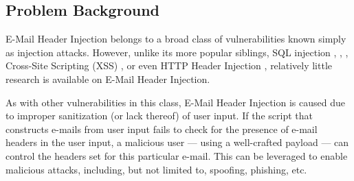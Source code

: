 \subsection{Problem Background}

E-Mail Header Injection belongs to a broad class of vulnerabilities known simply as injection attacks. However, unlike its more popular siblings, SQL injection \cite{sql1}, \cite{sql0}, \cite{sql2}, Cross-Site Scripting (XSS) \cite{Injection1}, \cite{KleinAmit} or even HTTP Header Injection \cite{sessionride}, relatively little research is available on E-Mail Header Injection.

As with other vulnerabilities in this class, E-Mail Header Injection is caused due to improper sanitization (or lack thereof) of user input. If the script that constructs e-mails from user input fails to check for the presence of e-mail headers in the user input, a malicious user --- using a well-crafted payload --- can control the headers set for this particular e-mail. This can be leveraged to enable malicious attacks, including, but not limited to, spoofing, phishing, etc.